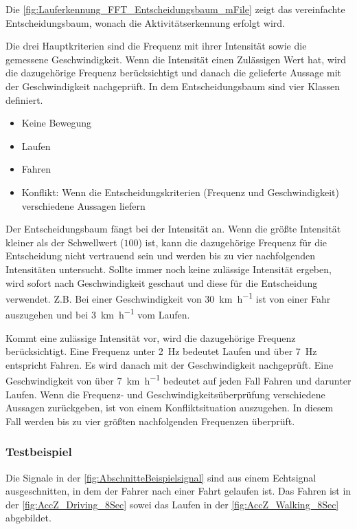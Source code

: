 Die \autoref{fig:Lauferkennung_FFT_Entscheidungsbaum_mFile} zeigt das vereinfachte Entscheidungsbaum, wonach die Aktivitäts\-erkennung erfolgt wird.

Die drei Hauptkriterien sind die Frequenz mit ihrer Intensität sowie die gemessene Geschwindigkeit. Wenn die Intensität einen Zulässigen Wert hat, wird die dazugehörige Frequenz berücksichtigt und danach die gelieferte Aussage mit der Geschwindigkeit nachgeprüft.
In dem Entscheidungsbaum sind vier Klassen definiert.
\begin{itemize}
	\item Keine Bewegung
	\item Laufen
	\item Fahren
	\item Konflikt: Wenn die Entscheidungskriterien (Frequenz und Geschwindigkeit) verschiedene Aussagen liefern
\end{itemize}
Der Entscheidungsbaum fängt bei der Intensität an. Wenn die größte Intensität kleiner als der Schwellwert ($100$) ist, kann die dazugehörige Frequenz für die Entscheidung nicht vertrauend sein und werden bis zu vier nachfolgenden Intensitäten untersucht. Sollte immer noch keine zulässige Intensität ergeben, wird sofort nach Geschwindigkeit geschaut und diese für die Entscheidung verwendet.
Z.B. Bei einer Geschwindigkeit von \SI[per-mode = symbol]{30}{\kilo\meter\per\hour} ist von einer Fahr auszugehen und bei \SI[per-mode = symbol]{3}{\kilo\meter\per\hour} vom Laufen.

Kommt eine zulässige Intensität vor, wird die dazugehörige Frequenz berücksichtigt. Eine Frequenz unter \SI{2}{\hertz} bedeutet \glqq Laufen\grqq{} und über \SI{7}{\hertz} entspricht \glqq Fahren\grqq{}. Es wird danach mit der Geschwindigkeit nachgeprüft. Eine Geschwindigkeit von über \SI[per-mode = symbol]{7}{\kilo\meter\per\hour} bedeutet auf jeden Fall \glqq Fahren\grqq{} und darunter \glqq Laufen\grqq{}.
Wenn die Frequenz- und Geschwindigkeitsüberprüfung verschiedene Aussagen zurückgeben, ist von einem Konfliktsituation auszugehen. In diesem Fall werden bis zu vier größten nachfolgenden Frequenzen überprüft.


\subsubsection{Testbeispiel}
Die Signale in der \autoref{fig:AbschnitteBeispielsignal} sind aus einem Echtsignal ausgeschnitten, in dem der Fahrer nach einer Fahrt gelaufen ist. Das Fahren ist in der \autoref{fig:AccZ_Driving_8Sec} sowei das Laufen in der \autoref{fig:AccZ_Walking_8Sec} abgebildet.

